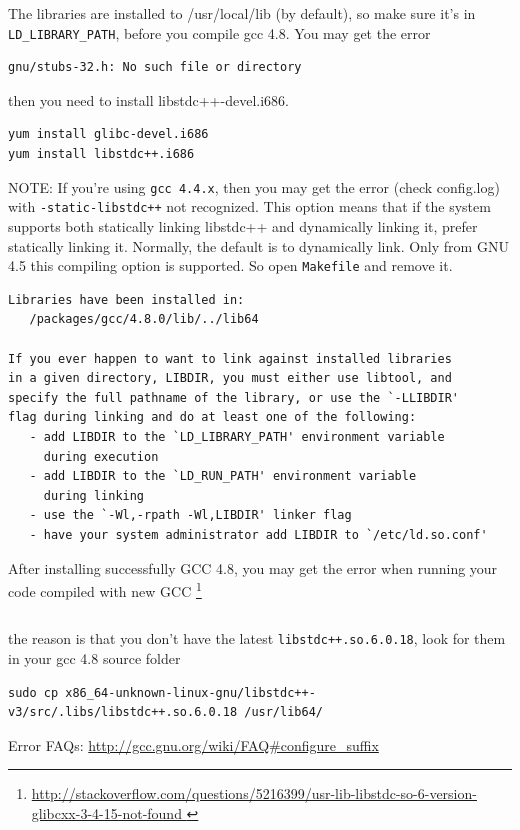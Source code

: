 The libraries are installed to /usr/local/lib (by default), so make sure it's in
\verb!LD_LIBRARY_PATH!, before you compile gcc 4.8. You may get the error
\begin{verbatim}
gnu/stubs-32.h: No such file or directory
\end{verbatim}
then you need to install libstdc++-devel.i686.
\begin{verbatim}
yum install glibc-devel.i686
yum install libstdc++.i686
\end{verbatim}

NOTE: If you're using \verb!gcc 4.4.x!, then you may get
the error (check config.log) with \verb!-static-libstdc++! not recognized. This option means that
if the system supports both statically linking libstdc++ and dynamically linking
it, prefer statically linking it. Normally, the default is to dynamically link.
Only from GNU 4.5 this compiling option is supported. So open \verb!Makefile!
and remove it.
\begin{verbatim}
Libraries have been installed in:
   /packages/gcc/4.8.0/lib/../lib64

If you ever happen to want to link against installed libraries
in a given directory, LIBDIR, you must either use libtool, and
specify the full pathname of the library, or use the `-LLIBDIR'
flag during linking and do at least one of the following:
   - add LIBDIR to the `LD_LIBRARY_PATH' environment variable
     during execution
   - add LIBDIR to the `LD_RUN_PATH' environment variable
     during linking
   - use the `-Wl,-rpath -Wl,LIBDIR' linker flag
   - have your system administrator add LIBDIR to `/etc/ld.so.conf'
\end{verbatim}

After installing successfully GCC 4.8, you may get the error when running your
code compiled with new GCC
\footnote{\url{http://stackoverflow.com/questions/5216399/usr-lib-libstdc-so-6-version-glibcxx-3-4-15-not-found }}
\begin{verbatim}

\end{verbatim}
the reason is that you don't have the latest \verb!libstdc++.so.6.0.18!, look
for them in your gcc 4.8 source folder
{\small \begin{verbatim}
sudo cp x86_64-unknown-linux-gnu/libstdc++-v3/src/.libs/libstdc++.so.6.0.18 /usr/lib64/
\end{verbatim}}


Error FAQs: \url{http://gcc.gnu.org/wiki/FAQ#configure_suffix}

